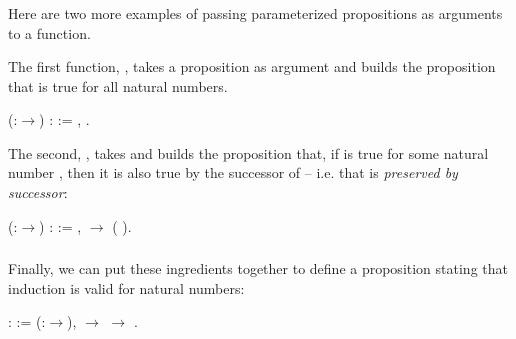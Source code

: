 \documentclass[12pt]{report}
\begin{document}
\subsubsection{ }

 Here are two more examples of passing parameterized propositions
    as arguments to a function.  


    The first function, , takes a proposition
     as argument and builds the proposition that  is true for
    all natural numbers. \begin{coqdoccode}
\coqdocemptyline
\coqdocnoindent
{}  (:\ensuremath{\rightarrow}) :  :=\coqdoceol
\coqdocindent{1.00em}
\coqdockw{\ensuremath{\forall}} ,  .\coqdoceol
\coqdocemptyline
\end{coqdoccode}
The second, , takes  and builds the proposition
    that, if  is true for some natural number , then it is also
    true by the successor of  -- i.e. that  is \textit{preserved by
    successor}: \begin{coqdoccode}
\coqdocemptyline
\coqdocnoindent
{}  (:\ensuremath{\rightarrow}) :  :=\coqdoceol
\coqdocindent{1.00em}
\coqdockw{\ensuremath{\forall}} ,   \ensuremath{\rightarrow}  ( ).\coqdoceol
\coqdocemptyline
\end{coqdoccode}
\subsubsection{ }

 Finally, we can put these ingredients together to define
a proposition stating that induction is valid for natural numbers: \begin{coqdoccode}
\coqdocemptyline
\coqdocnoindent
{}  :  :=\coqdoceol
\coqdocindent{1.00em}
\coqdockw{\ensuremath{\forall}} (:\ensuremath{\rightarrow}),\coqdoceol
\coqdocindent{2.00em}
  \ensuremath{\rightarrow}\coqdoceol
\coqdocindent{2.00em}
  \ensuremath{\rightarrow} \coqdoceol
\coqdocindent{2.00em}
 .\coqdoceol
\coqdocemptyline
\end{coqdoccode}
\end{document}
